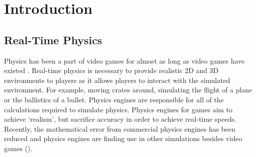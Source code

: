 \chapter{Introduction}
\section{Real-Time Physics}

Physics has been a part of video games for almost as long as video games have existed \cite{millington2007game}. Real-time physics is necessary to provide realistic 2D and 3D environments to players as it allows players to interact with the simulated environment. For example, moving crates around, simulating the flight of a plane or the ballistics of a bullet. Physics engines are responsible for all of the calculations required to simulate physics. Physics engines for games aim to achieve `realism', but sacrifice accuracy in order to achieve real-time speeds. Recently, the mathematical error from commercial physics engines has been reduced and physics engines are finding use in other simulations besides video games (\cite{Xu2017, Lu2017, Shah2018}).



